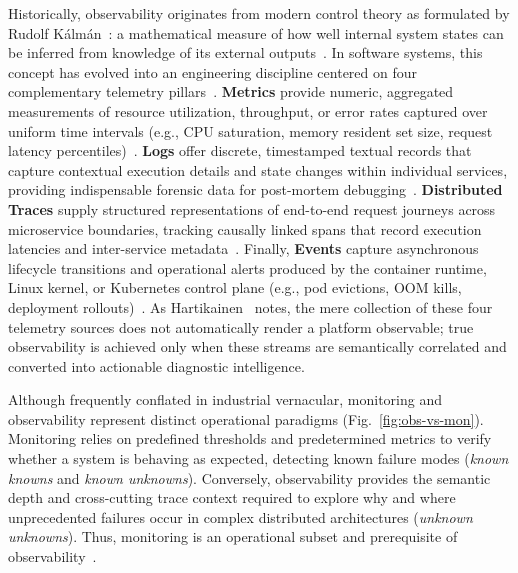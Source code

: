 \documentclass[sigconf, anonymous, balance=false]{acmart}
\begin{document}
Historically, observability originates from modern control theory as formulated by Rudolf Kálmán~\cite{kalman_1959}: a mathematical measure of how well internal system states can be inferred from knowledge of its external outputs~\cite{songtab_1984}. In software systems, this concept has evolved into an engineering discipline centered on four complementary telemetry pillars~\cite{kosinska_2023, bhatia_2025}. \textbf{Metrics} provide numeric, aggregated measurements of resource utilization, throughput, or error rates captured over uniform time intervals (e.g., CPU saturation, memory resident set size, request latency percentiles)~\cite{ellingwood_2017}. \textbf{Logs} offer discrete, timestamped textual records that capture contextual execution details and state changes within individual services, providing indispensable forensic data for post-mortem debugging~\cite{sre_2016}. \textbf{Distributed Traces} supply structured representations of end-to-end request journeys across microservice boundaries, tracking causally linked spans that record execution latencies and inter-service metadata~\cite{otel_primer_2025}. Finally, \textbf{Events} capture asynchronous lifecycle transitions and operational alerts produced by the container runtime, Linux kernel, or Kubernetes control plane (e.g., pod evictions, OOM kills, deployment rollouts)~\cite{hartikainen_2024}. As Hartikainen~\cite{hartikainen_2024} notes, the mere collection of these four telemetry sources does not automatically render a platform observable; true observability is achieved only when these streams are semantically correlated and converted into actionable diagnostic intelligence.



Although frequently conflated in industrial vernacular, monitoring and observability represent distinct operational paradigms (Fig.~\ref{fig:obs-vs-mon}). Monitoring relies on predefined thresholds and predetermined metrics to verify whether a system is behaving as expected, detecting known failure modes (\textit{known knowns} and \textit{known unknowns}). Conversely, observability provides the semantic depth and cross-cutting trace context required to explore why and where unprecedented failures occur in complex distributed architectures (\textit{unknown unknowns}). Thus, monitoring is an operational subset and prerequisite of observability~\cite{sridharan_2018}.
\end{document}
